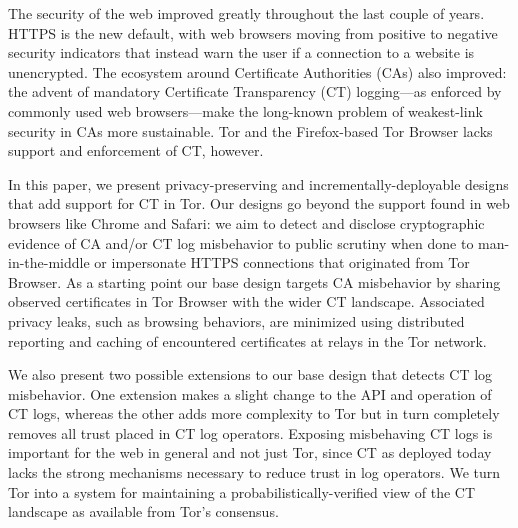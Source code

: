 The security of the web improved greatly throughout the last couple of years.
HTTPS is the new default, with web browsers moving from positive to
negative security indicators that instead warn the user if a connection to a
website is unencrypted.  The ecosystem around Certificate Authorities (CAs) also
improved:
	the advent of mandatory Certificate Transparency (CT) logging---as
	enforced by commonly used web browsers---make the long-known problem of
	weakest-link security in CAs more sustainable.
Tor and the Firefox-based Tor Browser lacks support and enforcement of CT,
however.

\hspace{12pt}
In this paper, we present privacy-preserving and incrementally-deployable
designs that add support for CT in Tor. Our designs go beyond the
support found in web browsers like Chrome and Safari:
	we aim to detect and disclose cryptographic evidence of CA and/or
	CT log misbehavior to public scrutiny when done to man-in-the-middle or
	impersonate HTTPS connections that originated from Tor Browser.
As a starting point our base design targets CA misbehavior by sharing observed
certificates in Tor Browser with the wider CT landscape.  Associated privacy
leaks, such as browsing behaviors, are minimized using distributed reporting and
caching of encountered certificates at relays in the Tor network.

\hspace{12pt}
We also present two possible extensions to our base design that detects CT log
misbehavior. One extension makes a slight change to the API and operation
of CT logs, whereas the other adds more complexity to Tor but in turn completely
removes all trust placed in CT log operators.  Exposing misbehaving CT logs
is important for the web in general and not just Tor, since CT as deployed today
lacks the strong mechanisms necessary to reduce trust in log operators.  We turn
Tor into a system for maintaining a probabilistically-verified view of the CT
landscape as available from Tor’s consensus.
